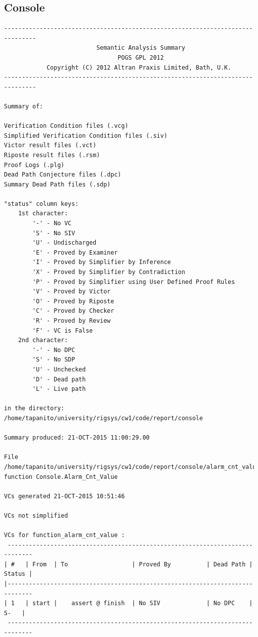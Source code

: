 \documentclass[a4paper, titlepage]{article}
\begin{document}
\subsection{Console}
{\small
\begin{lstlisting}
-------------------------------------------------------------------------------
                          Semantic Analysis Summary                            
                                POGS GPL 2012                                  
            Copyright (C) 2012 Altran Praxis Limited, Bath, U.K.               
-------------------------------------------------------------------------------

Summary of:

Verification Condition files (.vcg)
Simplified Verification Condition files (.siv)
Victor result files (.vct)
Riposte result files (.rsm)
Proof Logs (.plg)
Dead Path Conjecture files (.dpc)
Summary Dead Path files (.sdp)

"status" column keys:
    1st character:
        '-' - No VC
        'S' - No SIV
        'U' - Undischarged
        'E' - Proved by Examiner
        'I' - Proved by Simplifier by Inference
        'X' - Proved by Simplifier by Contradiction
        'P' - Proved by Simplifier using User Defined Proof Rules
        'V' - Proved by Victor
        'O' - Proved by Riposte
        'C' - Proved by Checker
        'R' - Proved by Review
        'F' - VC is False
    2nd character:
        '-' - No DPC
        'S' - No SDP
        'U' - Unchecked
        'D' - Dead path
        'L' - Live path

in the directory:
/home/tapanito/university/rigsys/cw1/code/report/console

Summary produced: 21-OCT-2015 11:00:29.00

File /home/tapanito/university/rigsys/cw1/code/report/console/alarm_cnt_value.vcg
function Console.Alarm_Cnt_Value

VCs generated 21-OCT-2015 10:51:46

VCs not simplified

VCs for function_alarm_cnt_value :
 -----------------------------------------------------------------------------
| #   | From  | To                  | Proved By          | Dead Path | Status |
|-----------------------------------------------------------------------------
| 1   | start |    assert @ finish  | No SIV             | No DPC    |   S-   |
 -----------------------------------------------------------------------------



\end{lstlisting}}
\end{document}
